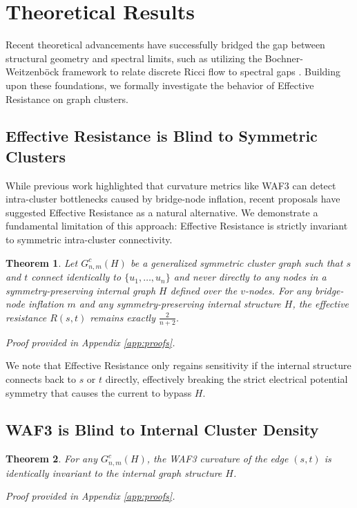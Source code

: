 \documentclass[10pt]{article} %
\newtheorem{theorem}{Theorem}
\begin{document}
\section{Theoretical Results}
Recent theoretical advancements have successfully bridged the gap between structural geometry and spectral limits, such as utilizing the Bochner-Weitzenb{\"o}ck framework to relate discrete Ricci flow to spectral gaps \citep{Anon2026}. Building upon these foundations, we formally investigate the behavior of Effective Resistance on graph clusters.
\subsection{Effective Resistance is Blind to Symmetric Clusters}

While previous work highlighted that curvature metrics like WAF3 can detect intra-cluster bottlenecks caused by bridge-node inflation, recent proposals have suggested Effective Resistance as a natural alternative. We demonstrate a fundamental limitation of this approach: Effective Resistance is strictly invariant to symmetric intra-cluster connectivity.

\begin{theorem}
Let $G^c_{n,m}(H)$ be a generalized symmetric cluster graph such that $s$ and $t$ connect identically to $\{u_1, \dots, u_n\}$ and never directly to any nodes in a symmetry-preserving internal graph $H$ defined over the $v$-nodes. For any bridge-node inflation $m$ and any symmetry-preserving internal structure $H$, the effective resistance $R(s,t)$ remains exactly $\frac{2}{n+2}$.
\end{theorem}
\textit{Proof provided in Appendix \ref{app:proofs}.}

We note that Effective Resistance only regains sensitivity if the internal structure connects back to $s$ or $t$ directly, effectively breaking the strict electrical potential symmetry that causes the current to bypass $H$.

\subsection{WAF3 is Blind to Internal Cluster Density}
\begin{theorem}
For any $G^c_{n,m}(H)$, the WAF3 curvature of the edge $(s,t)$ is identically invariant to the internal graph structure $H$.
\end{theorem}
\textit{Proof provided in Appendix \ref{app:proofs}.}
\end{document}
